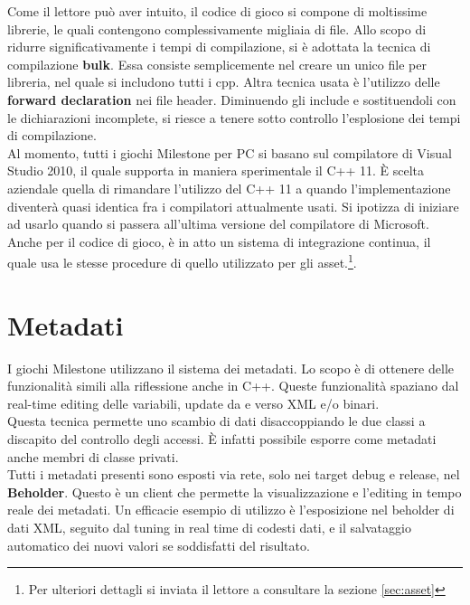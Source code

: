 Come il lettore può aver intuito, il codice di gioco si compone di moltissime librerie, le quali contengono complessivamente migliaia di file. Allo scopo di ridurre significativamente i tempi di compilazione, si è adottata la tecnica di compilazione \textbf{bulk}. Essa consiste semplicemente nel creare un unico file per libreria, nel quale si includono tutti i cpp. Altra tecnica usata è l'utilizzo delle \textbf{forward declaration} nei file header. Diminuendo gli include e sostituendoli con le dichiarazioni incomplete, si riesce a tenere sotto controllo l'esplosione dei tempi di compilazione.\\

Al momento, tutti i giochi Milestone per PC si basano sul compilatore di Visual Studio 2010, il quale supporta in maniera sperimentale il C++ 11. È scelta aziendale quella di rimandare l'utilizzo del C++ 11 a quando l'implementazione diventerà quasi identica fra i compilatori attualmente usati. Si ipotizza di iniziare ad usarlo quando si passera all'ultima versione del compilatore di Microsoft.\\

Anche per il codice di gioco, è in atto un sistema di integrazione continua, il quale usa le stesse procedure di quello utilizzato per gli asset.\footnote{Per ulteriori dettagli si inviata il lettore a consultare la sezione \ref{sec:asset}}.

\section{Metadati}

I giochi Milestone utilizzano il sistema dei metadati. Lo scopo è di ottenere delle funzionalità simili alla riflessione anche in C++. Queste funzionalità spaziano dal real-time editing delle variabili, update da e verso XML e/o binari.\\

Questa tecnica permette uno scambio di dati disaccoppiando le due classi a discapito del controllo degli accessi. È infatti possibile esporre come metadati anche membri di classe privati.\\

Tutti i metadati presenti sono esposti via rete, solo nei target debug e release, nel \textbf{Beholder}. Questo è un client che permette la visualizzazione e l'editing in tempo reale dei metadati. Un efficacie esempio di utilizzo è l'esposizione nel beholder di dati XML, seguito dal tuning in real time di codesti dati, e il salvataggio automatico dei nuovi valori se soddisfatti del risultato.\\

